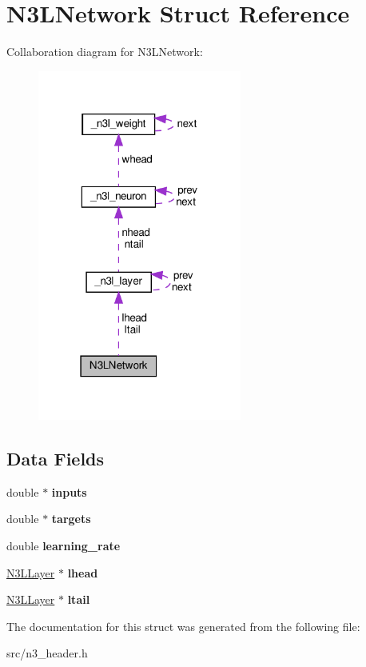 \hypertarget{structN3LNetwork}{}\section{N3\+L\+Network Struct Reference}
\label{structN3LNetwork}


Collaboration diagram for N3\+L\+Network\+:\nopagebreak
\begin{figure}[H]
\begin{center}
\leavevmode
\includegraphics[width=190pt]{structN3LNetwork__coll__graph}
\end{center}
\end{figure}
\subsection*{Data Fields}
\begin{DoxyCompactItemize}
\item 
\mbox{\label{structN3LNetwork_a45ff5bcae18502559925aba0cbd0313b}} 
double $\ast$ {\bfseries inputs}
\item 
\mbox{\label{structN3LNetwork_aba0f6767a66173743840b7c9fa919daf}} 
double $\ast$ {\bfseries targets}
\item 
\mbox{\label{structN3LNetwork_ae7c5e2ed74786685185cf2cbb955bf51}} 
double {\bfseries learning\+\_\+rate}
\item 
\mbox{\label{structN3LNetwork_ae77d4b7deecdc3c9590a4112689db2f8}} 
\mbox{\hyperlink{struct__n3l__layer}{N3\+L\+Layer}} $\ast$ {\bfseries lhead}
\item 
\mbox{\label{structN3LNetwork_a758fd06b3dda29e064ccd4bc4d27e1c3}} 
\mbox{\hyperlink{struct__n3l__layer}{N3\+L\+Layer}} $\ast$ {\bfseries ltail}
\end{DoxyCompactItemize}


The documentation for this struct was generated from the following file\+:\begin{DoxyCompactItemize}
\item 
src/n3\+\_\+header.\+h\end{DoxyCompactItemize}
